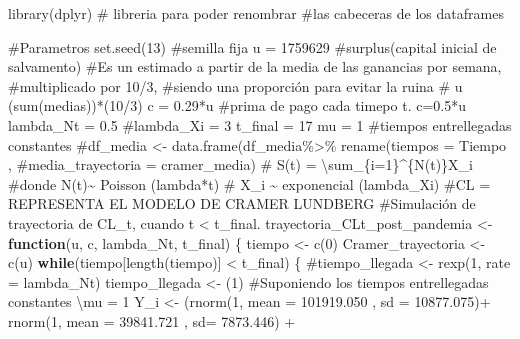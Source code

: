 \documentclass[
  us-letterpaper,
]{scrreprt}
\newenvironment{Shaded}{\begin{snugshade}}{\end{snugshade}}
\newcommand{\AttributeTok}[1]{\textcolor[rgb]{0.40,0.45,0.13}{#1}}
\newcommand{\CommentTok}[1]{\textcolor[rgb]{0.37,0.37,0.37}{#1}}
\newcommand{\ControlFlowTok}[1]{\textcolor[rgb]{0.00,0.23,0.31}{\textbf{#1}}}
\newcommand{\DecValTok}[1]{\textcolor[rgb]{0.68,0.00,0.00}{#1}}
\newcommand{\FloatTok}[1]{\textcolor[rgb]{0.68,0.00,0.00}{#1}}
\newcommand{\FunctionTok}[1]{\textcolor[rgb]{0.28,0.35,0.67}{#1}}
\newcommand{\NormalTok}[1]{\textcolor[rgb]{0.00,0.23,0.31}{#1}}
\newcommand{\OtherTok}[1]{\textcolor[rgb]{0.00,0.23,0.31}{#1}}
\newcommand{\SpecialCharTok}[1]{\textcolor[rgb]{0.37,0.37,0.37}{#1}}
\theoremstyle{plain}
\theoremstyle{plain}
\theoremstyle{definition}
\theoremstyle{remark}
\begin{document}
\begin{Shaded}
\begin{Highlighting}[]
\FunctionTok{library}\NormalTok{(dplyr) }\CommentTok{\# libreria para poder renombrar }
\CommentTok{\#las cabeceras de los dataframes}

\CommentTok{\#Parametros}
\FunctionTok{set.seed}\NormalTok{(}\DecValTok{13}\NormalTok{) }\CommentTok{\#semilla fija}
\NormalTok{u }\OtherTok{=} \DecValTok{1759629} \CommentTok{\#surplus(capital inicial de salvamento)}
\CommentTok{\#Es un estimado a partir de la media de las ganancias por semana, }
\CommentTok{\#multiplicado por 10/3, }
\CommentTok{\#siendo una proporción para evitar la ruina}
\CommentTok{\# u (sum(medias))*(10/3)}
\NormalTok{c }\OtherTok{=} \FloatTok{0.29}\SpecialCharTok{*}\NormalTok{u }\CommentTok{\#prima de pago cada timepo t. c=0.5*u}
\NormalTok{lambda\_Nt }\OtherTok{=} \FloatTok{0.5}
\CommentTok{\#lambda\_Xi = 3}
\NormalTok{t\_final }\OtherTok{=} \DecValTok{17}
\NormalTok{mu }\OtherTok{=} \DecValTok{1} \CommentTok{\#tiempos entrellegadas constantes}
\CommentTok{\#df\_media \textless{}{-} data.frame(df\_media\%\textgreater{}\% rename(tiempos = Tiempo ,}
\CommentTok{\#media\_trayectoria = cramer\_media)}
\CommentTok{\# S(t) = \textbackslash{}sum\_\{i=1\}\^{}\{N(t)\}X\_i}
\CommentTok{\#donde N(t)\textasciitilde{} Poisson (lambda*t)}
\CommentTok{\# X\_i \textasciitilde{} exponencial (lambda\_Xi)}
\CommentTok{\#CL = REPRESENTA EL MODELO DE CRAMER LUNDBERG}
\CommentTok{\#Simulación de trayectoria de CL\_t, cuando t \textless{} t\_final.}
\NormalTok{trayectoria\_CLt\_post\_pandemia }\OtherTok{\textless{}{-}} \ControlFlowTok{function}\NormalTok{(u, c, lambda\_Nt, t\_final)}
\NormalTok{\{}
\NormalTok{  tiempo }\OtherTok{\textless{}{-}} \FunctionTok{c}\NormalTok{(}\DecValTok{0}\NormalTok{)}
\NormalTok{  Cramer\_trayectoria }\OtherTok{\textless{}{-}} \FunctionTok{c}\NormalTok{(u)}
  \ControlFlowTok{while}\NormalTok{(tiempo[}\FunctionTok{length}\NormalTok{(tiempo)] }\SpecialCharTok{\textless{}}\NormalTok{ t\_final)}
\NormalTok{  \{}
    \CommentTok{\#tiempo\_llegada \textless{}{-} rexp(1, rate = lambda\_Nt)}
\NormalTok{    tiempo\_llegada }\OtherTok{\textless{}{-}}\NormalTok{ (}\DecValTok{1}\NormalTok{) }
\CommentTok{\#Suponiendo los tiempos entrellegadas constantes \textbackslash{}mu = 1}
\NormalTok{    Y\_i }\OtherTok{\textless{}{-}}\NormalTok{  (}\FunctionTok{rnorm}\NormalTok{(}\DecValTok{1}\NormalTok{, }\AttributeTok{mean =} \FloatTok{101919.050}\NormalTok{ , }\AttributeTok{sd =} \FloatTok{10877.075}\NormalTok{)}\SpecialCharTok{+} 
              \FunctionTok{rnorm}\NormalTok{(}\DecValTok{1}\NormalTok{, }\AttributeTok{mean =}  \FloatTok{39841.721}\NormalTok{ , }\AttributeTok{sd=} \FloatTok{7873.446}\NormalTok{) }\SpecialCharTok{+} 

\end{Highlighting}
\end{Shaded}
\end{document}
